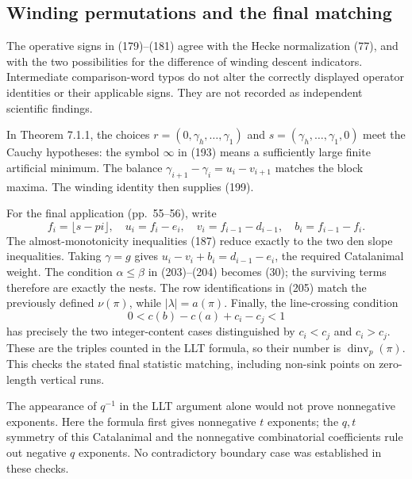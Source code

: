 \documentclass[10pt]{article}
\begin{document}
\subsection*{Winding permutations and the final matching}
The operative signs in (179)–(181) agree with the Hecke normalization (77), and with the two possibilities for the difference of winding descent indicators. Intermediate comparison-word typos do not alter the correctly displayed operator identities or their applicable signs. They are not recorded as independent scientific findings.\par
In Theorem 7.1.1, the choices \(r=(0,\gamma_h,\ldots,\gamma_1)\) and \(s=(\gamma_h,\ldots,\gamma_1,0)\) meet the Cauchy hypotheses: the symbol \(\infty\) in (193) means a sufficiently large finite artificial minimum. The balance \(\gamma_{i+1}-\gamma_i=u_i-v_{i+1}\) matches the block maxima. The winding identity then supplies (199).\par
For the final application (pp. 55–56), write \[f_i=\lfloor s-pi\rfloor,\quad
 u_i=f_i-e_i,\quad v_i=f_{i-1}-d_{i-1},\quad
 b_i=f_{i-1}-f_i.\] The almost-monotonicity inequalities (187) reduce exactly to the two den slope inequalities. Taking \(\gamma=g\) gives \(u_i-v_i+b_i=d_{i-1}-e_i\), the required Catalanimal weight. The condition \(\alpha\leq\beta\) in (203)–(204) becomes (30); the surviving terms therefore are exactly the nests. The row identifications in (205) match the previously defined \(\nu(\pi)\), while \(|\lambda|=a(\pi)\). Finally, the line-crossing condition \[0<c(b)-c(a)+c_i-c_j<1\] has precisely the two integer-content cases distinguished by \(c_i<c_j\) and \(c_i>c_j\). These are the triples counted in the LLT formula, so their number is \(\operatorname{dinv}_p(\pi)\). This checks the stated final statistic matching, including non-sink points on zero-length vertical runs.\par
The appearance of \(q^{-1}\) in the LLT argument alone would not prove nonnegative exponents. Here the formula first gives nonnegative \(t\) exponents; the \(q,t\) symmetry of this Catalanimal and the nonnegative combinatorial coefficients rule out negative \(q\) exponents. No contradictory boundary case was established in these checks.\par
\end{document}
